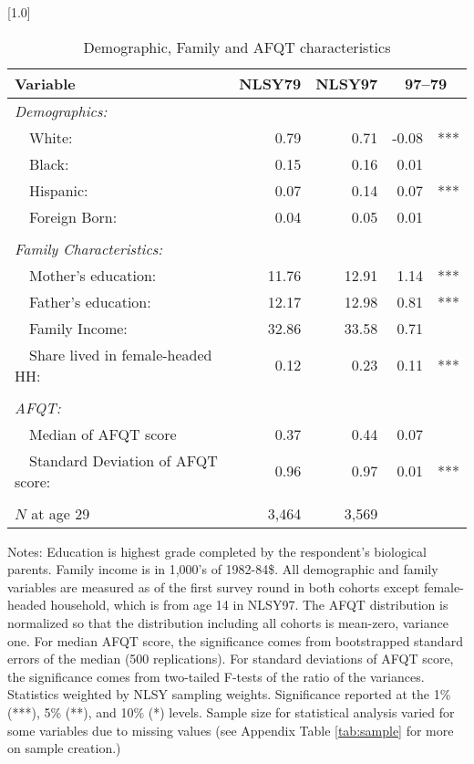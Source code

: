\begin{table}[ht]
\caption{Demographic, Family and AFQT characteristics}
\label{tab:background}
\centering
\scalebox{1.0}[1.0]{%
\begin{threeparttable}
\begin{tabular}{lrrr@{}l}
\toprule 
Variable & NLSY79 & NLSY97 & \multicolumn{2}{c}{97--79} \\
\midrule 
\multicolumn{5}{l}{\emph{Demographics:}} \\
~~White:                             & 0.79 & 0.71 & -0.08 & *** \\ 
~~Black:                             & 0.15 & 0.16 & 0.01 &   \\ 
~~Hispanic:                          & 0.07 & 0.14 & 0.07 & *** \\ 
~~Foreign Born:                      & 0.04 & 0.05 & 0.01 &   \\ 
\vspace{-6pt}  \\
\multicolumn{5}{l}{\emph{Family Characteristics:}} \\
~~Mother's education:                & 11.76 & 12.91 & 1.14 & *** \\ 
~~Father's education:                & 12.17 & 12.98 & 0.81 & *** \\ 
~~Family Income:                     & 32.86 & 33.58 & 0.71 &   \\ 
~~Share lived in female-headed HH:   & 0.12 & 0.23 & 0.11 & *** \\ 
\vspace{-6pt}  \\
\multicolumn{5}{l}{\emph{AFQT:}} \\
~~Median of AFQT score               & 0.37 & 0.44 & 0.07 &   \\ 
~~Standard Deviation of AFQT score:  & 0.96 & 0.97 & 0.01 & *** \\ 
\vspace{-6pt}  \\
$N$ at age 29               &  3,464 &  3,569 & & \\ 
\bottomrule 
\end{tabular} 
\footnotesize{Notes: Education is highest grade completed by the respondent's biological parents. Family income is in 1,000's of 1982-84\$. All demographic and family variables are measured as of the first survey round in both cohorts except female-headed household, which is from age 14 in NLSY97. The AFQT distribution is normalized so that the distribution including all cohorts is mean-zero, variance one. For median AFQT score, the significance comes from bootstrapped standard errors of the median (500 replications). For standard deviations of AFQT score, the significance comes from two-tailed F-tests of the ratio of the variances. Statistics weighted by NLSY sampling weights. Significance reported at the 1\% (***), 5\% (**), and 10\% (*) levels. Sample size for statistical analysis varied for some variables due to missing values (see Appendix Table \ref{tab:sample} for more on sample creation.)}

\end{threeparttable}}
\end{table}
